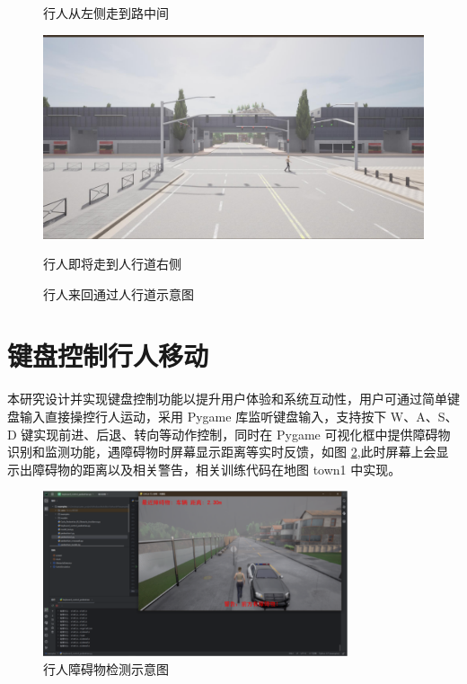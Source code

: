 \begin{figure}[H]
\begin{minipage}{0.24\textwidth}
        \caption{行人从左侧走到路中间}
    \end{minipage}%
    \begin{minipage}{0.24\textwidth}
        \centering
        \includegraphics[width=\textwidth]{images/crossing_walking8.pdf}
        \caption{行人即将走到人行道右侧}
    \end{minipage}
    \caption{行人来回通过人行道示意图}
    \label{fig:walking_back_and_forth}
\end{figure}

\section{键盘控制行人移动}
本研究设计并实现键盘控制功能以提升用户体验和系统互动性，用户可通过简单键盘输入直接操控行人运动，采用 Pygame 库监听键盘输入，支持按下 W、A、S、D 键实现前进、后退、转向等动作控制，同时在 Pygame 可视化框中提供障碍物识别和监测功能，遇障碍物时屏幕显示距离等实时反馈，如图 \ref{fig:collision_detection},此时屏幕上会显示出障碍物的距离以及相关警告，相关训练代码在地图 town1 中实现。

\begin{figure}[H]
    \centering
    \includegraphics[width=0.8\textwidth]{images/collision_detection.pdf}
    \caption{行人障碍物检测示意图}
    \label{fig:collision_detection}
\end{figure}

